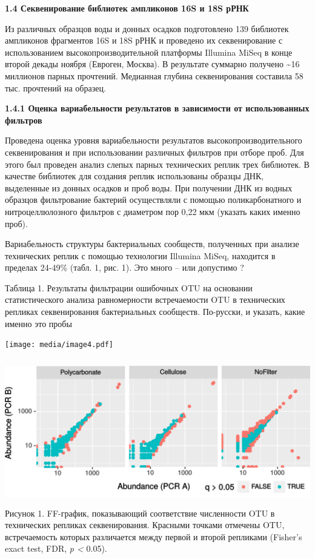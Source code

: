 \documentclass[a4paper,12pt,openany,final]{extreport}
\begin{document}
\textbf{1.4 Секвенирование библиотек ампликонов 16S и 18S рРНК }

Из различных образцов воды и донных осадков подготовлено 139 библиотек
ампликонов фрагментов 16S и 18S рРНК и проведено их секвенирование с
использованием высокопроизводительной платформы Illumina MiSeq в конце
второй декады ноября (Евроген, Москва). В результате суммарно получено
\textasciitilde{}16 миллионов парных прочтений. Медианная глубина
секвенирования составила 58 тыс. прочтений на образец.

\textbf{1.4.1 Оценка вариабельности результатов в зависимости от
использованных фильтров}

Проведена оценка уровня вариабельности результатов
высокопроизводительного секвенирования и при использовании различных
фильтров при отборе проб. Для этого был проведен анализ слепых парных
технических реплик трех библиотек. В качестве библиотек для создания
реплик использованы образцы ДНК, выделенные из донных осадков и проб
воды. При получении ДНК из водных образцов фильтрование бактерий
осуществляли с помощью поликарбонатного и нитроцеллюлозного фильтров с
диаметром пор 0,22 мкм (указать каких именно проб).

Вариабельность структуры бактериальных сообществ, полученных при анализе
технических реплик с помощью технологии Illumina MiSeq, находится в
пределах 24-49\% (табл. 1, рис. 1). Это много -- или допустимо ?

Таблица 1. Результаты фильтрации ошибочных OTU на основании
статистического анализа равномерности встречаемости OTU в технических
репликах секвенирования бактериальных сообществ. По-русски, и указать,
какие именно это пробы

\texttt{[image: media/image4.pdf]}

\includegraphics[width=5.81875in,height=2.5125in]{media/image5.png}Рисунок
1. FF-график, показывающий соответствие численности OTU в технических
репликах секвенирования. Красными точками отмечены OTU, встречаемость
которых различается между первой и второй репликами (Fisher's exact
test, FDR, \emph{p \textless{}} 0.05).
\end{document}
